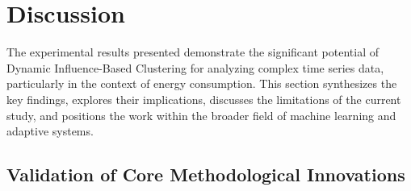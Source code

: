 \documentclass[final,authoryear,3p,times,review,sort&compress]{elsarticle}
\begin{document}
\begin{table}[t!]
\centering
\caption{Empirically Measured Runtimes (Seconds) for K-means based Clustering (Energy Dataset, K=3, Test Set $\approx$ 6000 Instances). ``Clustering" refers to dynamic K-means for influence spaces and standard K-means for Raw Features.}
\label{tab:efficiency_exp}
\end{table}

\section{Discussion}
\label{sec:diss}
The experimental results presented demonstrate the significant potential of Dynamic Influence-Based Clustering for analyzing complex time series data, particularly in the context of energy consumption. This section synthesizes the key findings, explores their implications, discusses the limitations of the current study, and positions the work within the broader field of machine learning and adaptive systems.

\subsection{Validation of Core Methodological Innovations}
\end{document}
